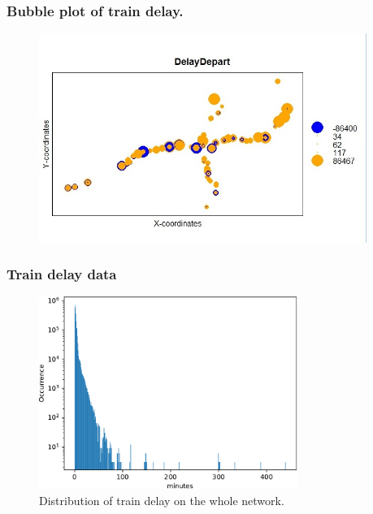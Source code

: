 \documentclass{beamer}
\begin{document}


\begin{frame}\frametitle {Bubble plot of train delay. }
\begin{figure}
  \centering
  \includegraphics[width=0.95\textwidth]{bublleeeeee.jpeg}
 \end{figure}
\end{frame}


\begin{frame}\frametitle{Train delay data}
\begin{figure}
  \centering
   \includegraphics[width=0.75\textwidth]{plots/delay2log-crop.pdf}
    \caption{Distribution of train delay on the whole network.}
\end{figure}
\end{frame}
\end{document}
